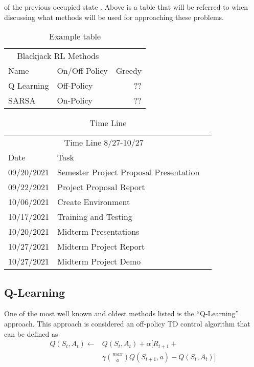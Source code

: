 \documentclass[twoside,twocolumn]{article}
\begin{document}
of the previous occupied state \cite{GeeksforGeeks:2021dg}.  Above is a table that will be referred to when discussing what methods will be used for approaching these problems. \\ 

\begin{table}
\caption{Example table}
\centering
\begin{tabular}{llr}
\toprule
\multicolumn{2}{c}{Blackjack RL Methods} \\
\cmidrule(r){1-2}
Name & On/Off-Policy  & Greedy \\
\midrule
Q Learning & Off-Policy & ?? \\
SARSA & On-Policy & ?? \\
\bottomrule
\end{tabular}
\end{table}

\begin{table}
\caption{Time Line}
\centering
\begin{tabular}{llr}
\toprule
\multicolumn{2}{c}{Time Line 8/27-10/27} \\
\cmidrule(r){1-2}
Date & Task   \\
\midrule
09/20/2021 & Semester Project Proposal Presentation \\
09/22/2021 & Project Proposal Report\\
10/06/2021 & Create Environment \\
10/17/2021 & Training and Testing\\
10/20/2021 & Midterm Presentations\\
10/27/2021 & Midterm Project Report\\
10/27/2021 & Midterm Project Demo\\
\bottomrule
\end{tabular}
\end{table}


\subsection{Q-Learning}

\indent One of the most well known and oldest methods listed is the “Q-Learning” approach.  This approach is considered an off-policy TD control algorithm that can be defined as\\

\begin{align*}
 Q(S_t,A_t) \leftarrow & Q(S_t,A_t)+ \alpha\big[ R_{t+1} +\\
& \gamma \binom{max}{a} Q(S_{t+1}, a) - Q(S_t,A_t)\big]
\end{align*}
\end{document}
